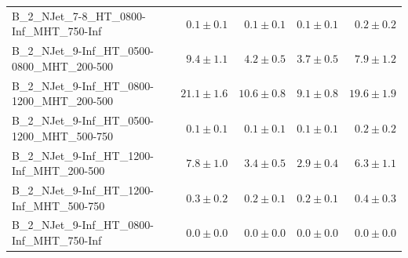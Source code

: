 \documentclass{beamer}
\begin{document}
\begin{frame}
\begin{tabular}{lrrrr}
      B\_2\_NJet\_7-8\_HT\_0800-Inf\_MHT\_750-Inf &               $0.1\pm0.1$&              $0.1\pm0.1$&              $0.1\pm0.1$&                   $0.2\pm0.2$ \\
   B\_2\_NJet\_9-Inf\_HT\_0500-0800\_MHT\_200-500 &               $9.4\pm1.1$&              $4.2\pm0.5$&              $3.7\pm0.5$&                   $7.9\pm1.2$ \\
   B\_2\_NJet\_9-Inf\_HT\_0800-1200\_MHT\_200-500 &              $21.1\pm1.6$&             $10.6\pm0.8$&              $9.1\pm0.8$&                  $19.6\pm1.9$ \\
   B\_2\_NJet\_9-Inf\_HT\_0500-1200\_MHT\_500-750 &               $0.1\pm0.1$&              $0.1\pm0.1$&              $0.1\pm0.1$&                   $0.2\pm0.2$ \\
    B\_2\_NJet\_9-Inf\_HT\_1200-Inf\_MHT\_200-500 &               $7.8\pm1.0$&              $3.4\pm0.5$&              $2.9\pm0.4$&                   $6.3\pm1.1$ \\
    B\_2\_NJet\_9-Inf\_HT\_1200-Inf\_MHT\_500-750 &               $0.3\pm0.2$&              $0.2\pm0.1$&              $0.2\pm0.1$&                   $0.4\pm0.3$ \\
    B\_2\_NJet\_9-Inf\_HT\_0800-Inf\_MHT\_750-Inf &               $0.0\pm0.0$&              $0.0\pm0.0$&              $0.0\pm0.0$&                   $0.0\pm0.0$ \\
\end{tabular}
\end{frame}
\end{document}
